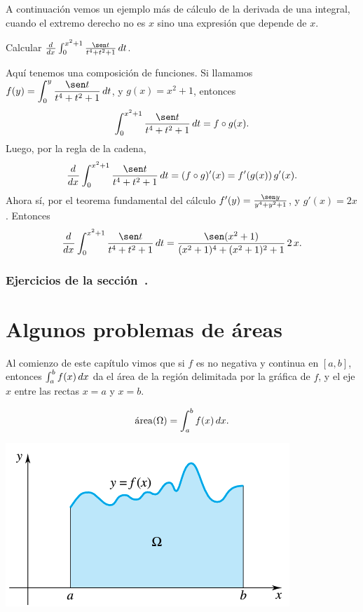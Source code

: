 A continuación vemos un ejemplo más de cálculo de la derivada de una integral, cuando el extremo derecho no es $x$ sino una expresión que depende de $x$.


\begin{example}
  Calcular $\dd[]{}{x} \int_0^{x^2+1} \frac{\sen t}{t^4+t^2+1} \dt$.

  Aquí tenemos una composición de funciones. Si llamamos $\D f(y)=\int_0^{y} \frac{\sen t}{t^4+t^2+1} \dt$, y $g(x)=x^2+1$, entonces 
  \[
    \int_0^{x^2+1} \frac{\sen t}{t^4+t^2+1} \dt = f\circ g(x).
  \]
  Luego, por la regla de la cadena,
  \[
    \dd[]{}{x} \int_0^{x^2+1} \frac{\sen t}{t^4+t^2+1} \dt
    = (f\circ g)'(x) = f'(g(x))\, g'(x).
  \]
  Ahora sí, por el teorema fundamental del cálculo $f'(y)= \frac{\sen y}{y^4+y^2+1}$, y $g'(x)=2x$. Entonces
  \[
    \dd[]{}{x} \int_0^{x^2+1} \frac{\sen t}{t^4+t^2+1} \dt
    = \frac{\sen (x^2+1)}{(x^2+1)^4+(x^2+1)^2+1} \, 2\, x.
  \]
\end{example}

\subsubsection*{Ejercicios de la sección~.}

\begin{enumerate}
  
\end{enumerate}



\section{Algunos problemas de áreas}

Al comienzo de este capítulo vimos que si $f$ es no negativa y continua en $[a,b]$, entonces $\int_a^b f(x)\,dx$ da el área de la región delimitada por la gráfica de  $f$, y el eje $x$ entre las rectas $x=a$ y $x=b$.

\noindent
\begin{minipage}{.7\textwidth}
$$ \mathrm{\protect\acute{a}rea}(\Omega)=\int_a^b f(x)\,dx.$$
\end{minipage}
\begin{minipage}{.29\textwidth}
  \centering
  \includegraphics[width=.9\textwidth]{pics/area-bajo-curva.png}
\end{minipage}


